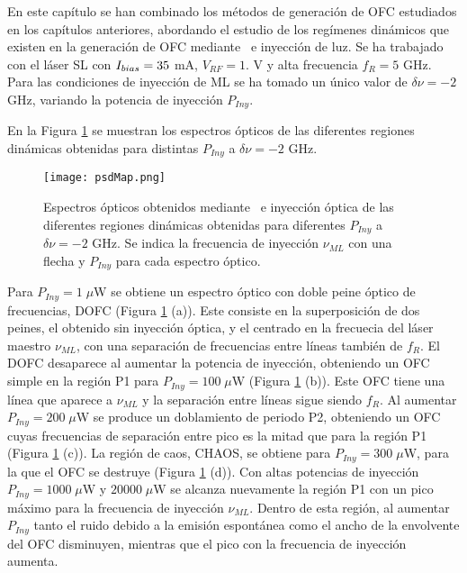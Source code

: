 \graphicspath{{../Graphics/Cpt3-CombInject/}}

En este cap\'itulo se han combinado los m\'etodos de generaci\'on de OFC estudiados en los cap\'itulos anteriores, abordando el estudio de los regímenes din\'amicos que existen en la generaci\'on de OFC mediante \gs\ e inyecci\'on de luz. Se ha trabajado con el l\'aser SL con $I_{bias} = 35$ mA, $V_{RF} = 1.$ V y alta frecuencia $f_R = 5$ GHz. Para las condiciones de inyecci\'on de ML se ha tomado un \'unico valor de $\delta\nu = -2$ GHz, variando la potencia de inyecci\'on $P_{Iny}$.

En la Figura \ref{Img:MapGS-IO} se muestran los espectros \'opticos de las diferentes regiones din\'amicas obtenidas para distintas $P_{Iny}$ a $\delta\nu = -2$ GHz. 

	\begin{figure}[H]
		\centering
		\texttt{[image: psdMap.png]}
		\caption{\label{Img:MapGS-IO}Espectros \'opticos obtenidos mediante \gs\ e inyección \'optica de las diferentes regiones dinámicas obtenidas para diferentes $P_{Iny}$ a $\delta\nu = -2$ GHz. Se indica la frecuencia de inyección $\nu_{ML}$ con una flecha y $P_{Iny}$ para cada espectro \'optico.}
	\end{figure}

Para $P_{Iny} = 1\;\mu$W se obtiene un espectro \'optico con doble peine \'optico de frecuencias, DOFC (Figura \ref{Img:MapGS-IO} (a)). Este consiste en la superposición de dos peines, el obtenido sin inyección óptica, y el centrado en la frecuecia del láser maestro $\nu_{ML}$, con una separación de frecuencias entre líneas también de $f_R$. El DOFC desaparece al aumentar la potencia de inyección, obteniendo un OFC simple en la regi\'on P1 para $P_{Iny} = 100\;\mu$W (Figura \ref{Img:MapGS-IO} (b)). Este OFC tiene una línea que aparece a $\nu_{ML}$ y la separación entre líneas sigue siendo $f_R$. Al aumentar $P_{Iny} = 200 \;\mu$W se produce un doblamiento de periodo P2, obteniendo un OFC cuyas frecuencias de separaci\'on entre pico es la mitad que para la regi\'on P1 (Figura \ref{Img:MapGS-IO} (c)). La región de caos, CHAOS, se obtiene para $P_{Iny} = 300\;\mu$W, para la que el OFC se destruye (Figura \ref{Img:MapGS-IO} (d)). Con altas potencias de inyecci\'on $P_{Iny} = 1000\;\mu$W y $ 20000\;\mu$W se alcanza nuevamente la regi\'on P1 con un pico m\'aximo para la frecuencia de inyecci\'on $\nu_{ML}$. Dentro de esta regi\'on, al aumentar $P_{Iny}$ tanto el ruido debido a la emisi\'on espont\'anea como el ancho de la envolvente del OFC disminuyen, mientras que el pico con la frecuencia de inyecci\'on aumenta.


